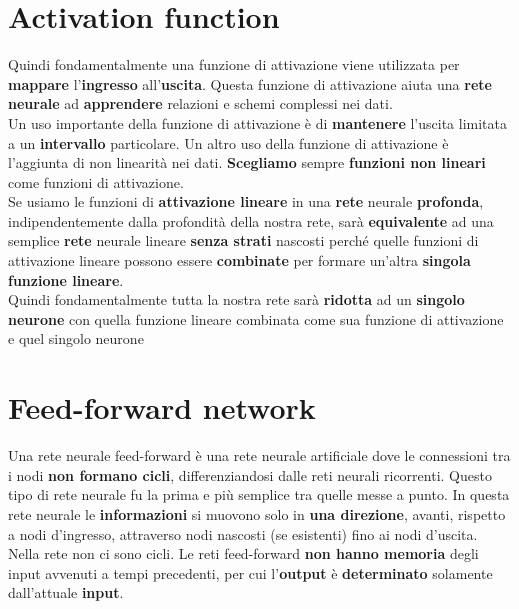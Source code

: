 \documentclass{article}
\begin{document}
\section{Activation function}
Quindi fondamentalmente una funzione di attivazione viene utilizzata per \textbf{mappare} l’\textbf{ingresso} all’\textbf{uscita}. Questa funzione di attivazione aiuta una \textbf{rete} \textbf{neurale} ad \textbf{apprendere} relazioni e schemi complessi nei dati.\\
Un uso importante della funzione di attivazione è di \textbf{mantenere} l’uscita limitata a un \textbf{intervallo} particolare. Un altro uso della funzione di attivazione è l’aggiunta di non linearità nei dati. \textbf{Scegliamo} sempre \textbf{funzioni non lineari} come funzioni di attivazione.\\
Se usiamo le funzioni di \textbf{attivazione lineare} in una \textbf{rete} neurale \textbf{profonda}, indipendentemente dalla profondità della nostra rete, sarà \textbf{equivalente} ad una semplice \textbf{rete} neurale lineare \textbf{senza strati} nascosti perché quelle funzioni di attivazione lineare possono essere \textbf{combinate} per formare un’altra \textbf{singola funzione lineare}.  \\

Quindi fondamentalmente tutta la nostra rete sarà \textbf{ridotta} ad un \textbf{singolo neurone} con quella funzione lineare combinata come sua funzione di attivazione e quel singolo neurone

\section{Feed-forward
network}
Una rete neurale feed-forward  è una rete neurale artificiale dove le connessioni tra i nodi \textbf{non formano cicli}, differenziandosi dalle reti neurali ricorrenti. Questo tipo di rete neurale fu la prima e più semplice tra quelle messe a punto. In questa rete neurale le \textbf{informazioni} si muovono solo in \textbf{una direzione}, avanti, rispetto a nodi d'ingresso, attraverso nodi nascosti (se esistenti) fino ai nodi d'uscita. Nella rete non ci sono cicli. Le reti feed-forward \textbf{non hanno memoria }degli input avvenuti a tempi precedenti, per cui l'\textbf{output} è \textbf{determinato} solamente dall'attuale \textbf{input}.
\end{document}
